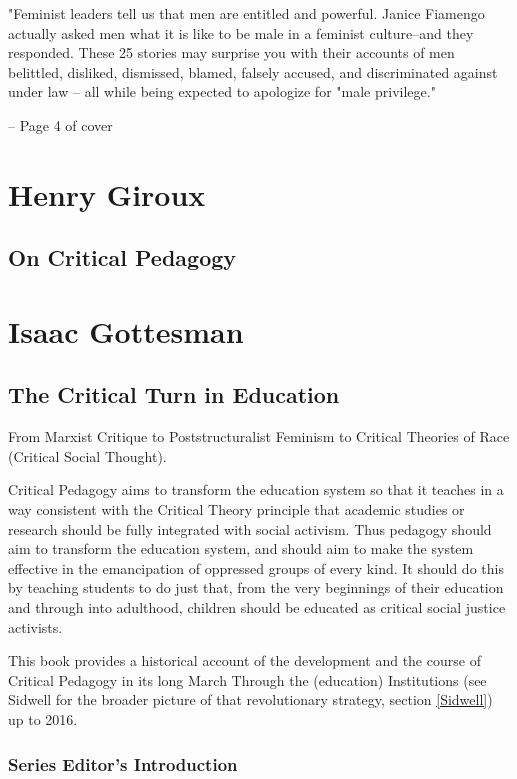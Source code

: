 \documentclass[10pt,titlepage]{book}
\begin{document}
"Feminist leaders tell us that men are entitled and powerful. Janice Fiamengo actually asked men what it is like to be male in a feminist culture--and they responded.
These 25 stories may surprise you with their accounts of men belittled, disliked, dismissed, blamed, falsely accused, and discriminated against under law -- all while being expected to apologize for "male privilege."

-- Page 4 of cover


\section{Henry Giroux}\label{Giroux}

\subsection{On Critical Pedagogy \cite{giroux-critped}}

\pagebreak

\section{Isaac Gottesman}\label{Gottesman}

\subsection{The Critical Turn in Education \cite{gottesman-criturn}}

From Marxist Critique to Poststructuralist Feminism to Critical Theories of Race (Critical Social Thought).

Critical Pedagogy aims to transform the education system so that it teaches in a way consistent with the Critical Theory principle that academic studies or research should be fully integrated with social activism.
Thus pedagogy should aim to transform the education system, and should aim to make the system effective in the emancipation of oppressed groups of every kind.
It should do this by teaching students to do just that, from the very beginnings of their education and through into adulthood, children should be educated as critical social justice activists.

This book provides a historical account of the development and the course of Critical Pedagogy in its long March Through the (education) Institutions (see Sidwell for the broader picture of that revolutionary strategy, section \ref{Sidwell}) up to 2016.

\subsubsection{Series Editor's Introduction}
\end{document}
